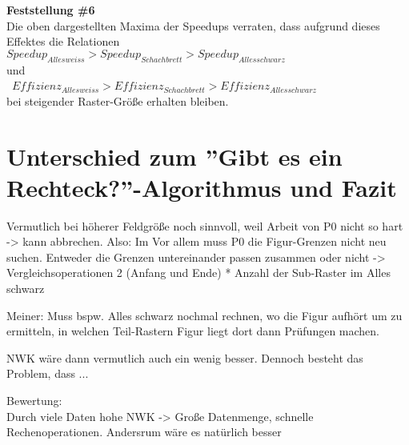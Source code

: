 \documentclass[
10pt, %
a4paper, %
oneside, %
headinclude,footinclude, %
BCOR5mm, %
]{scrartcl}
\begin{document}
\textbf{Feststellung \#6}\\
Die oben dargestellten Maxima der Speedups verraten, dass aufgrund dieses Effektes die Relationen\\ 
\(Speedup_{Alles weiss} > Speedup_{Schachbrett} > Speedup_{Alles schwarz} \)\\
und\\\
\(Effizienz_{Alles weiss} > Effizienz_{Schachbrett} > Effizienz_{Alles schwarz} \)\\
bei steigender Raster-Größe erhalten bleiben.

\section{Unterschied zum ''Gibt es ein Rechteck?''-Algorithmus und Fazit}


Vermutlich bei höherer Feldgröße noch sinnvoll, weil Arbeit von P0 nicht so hart -> kann abbrechen.
Also: Im 
Vor allem muss P0 die Figur-Grenzen nicht neu suchen.
Entweder die Grenzen untereinander passen zusammen oder nicht -> Vergleichsoperationen 2 (Anfang und Ende) * Anzahl der Sub-Raster im Alles schwarz

Meiner: Muss bspw. Alles schwarz nochmal rechnen, wo die Figur aufhört um zu ermitteln, in welchen Teil-Rastern Figur liegt dort dann Prüfungen machen.

NWK wäre dann vermutlich auch ein wenig besser. Dennoch besteht das Problem, dass ...

Bewertung:\\
Durch viele Daten hohe NWK -> 
Große Datenmenge, schnelle Rechenoperationen.
Andersrum wäre es natürlich besser\\
\end{document}
